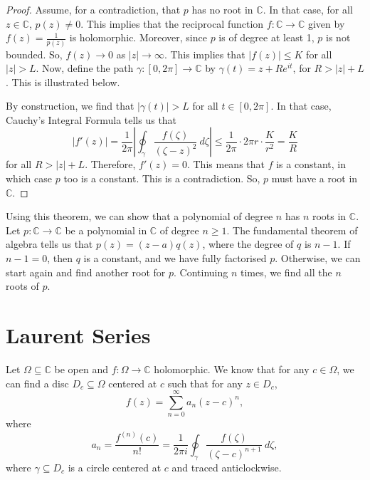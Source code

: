 \documentclass[a4paper, openany]{memoir}
\theoremstyle{definition}
\theoremstyle{plain}
\begin{document}
\begin{proof}
Assume, for a contradiction, that $p$ has no root in $\mathbb{C}$. In that case, for all $z \in \mathbb{C}$, $p(z) \neq 0$. This implies that the reciprocal function $f: \mathbb{C} \to \mathbb{C}$ given by $f(z) = \frac{1}{p(z)}$ is holomorphic. Moreover, since $p$ is of degree at least 1, $p$ is not bounded. So, $f(z) \to 0$ as $|z| \to \infty$. This implies that $|f(z)| \leq K$ for all $|z| > L$. Now, define the path $\gamma:[0, 2\pi] \to \mathbb{C}$ by $\gamma(t) = z + Re^{it}$, for $R > |z| + L$. This is illustrated below.
\begin{figure}[H]
    \centering
\end{figure}
\noindent By construction, we find that $|\gamma(t)| > L$ for all $t \in [0, 2\pi]$. In that case, Cauchy's Integral Formula tells us that
\[|f'(z)| = \frac{1}{2\pi} \left|\oint_\gamma \frac{f(\zeta)}{(\zeta - z)^2} \ d\zeta\right| \leq \frac{1}{2\pi} \cdot 2\pi r \cdot \frac{K}{r^2} = \frac{K}{R}\]
for all $R > |z| + L$. Therefore, $f'(z) = 0$. This means that $f$ is a constant, in which case $p$ too is a constant. This is a contradiction. So, $p$ must have a root in $\mathbb{C}$.
\end{proof}
\noindent Using this theorem, we can show that a polynomial of degree $n$ has $n$ roots in $\mathbb{C}$. Let $p: \mathbb{C} \to \mathbb{C}$ be a polynomial in $\mathbb{C}$ of degree $n \geq 1$. The fundamental theorem of algebra tells us that $p(z) = (z - a)q(z)$, where the degree of $q$ is $n - 1$. If $n - 1 = 0$, then $q$ is a constant, and we have fully factorised $p$. Otherwise, we can start again and find another root for $p$. Continuing $n$ times, we find all the $n$ roots of $p$.
\newpage

\section{Laurent Series}
Let $\Omega \subseteq \mathbb{C}$ be open and $f: \Omega \to \mathbb{C}$ holomorphic. We know that for any $c \in \Omega$, we can find a disc $D_c \subseteq \Omega$ centered at $c$ such that for any $z \in D_c$,
\[f(z) = \sum_{n=0}^\infty a_n (z - c)^n,\]
where
\[a_n = \frac{f^{(n)}(c)}{n!} = \frac{1}{2\pi i} \oint_\gamma \frac{f(\zeta)}{(\zeta - c)^{n+1}} \ d\zeta,\]
where $\gamma \subseteq D_c$ is a circle centered at $c$ and traced anticlockwise.
\end{document}
